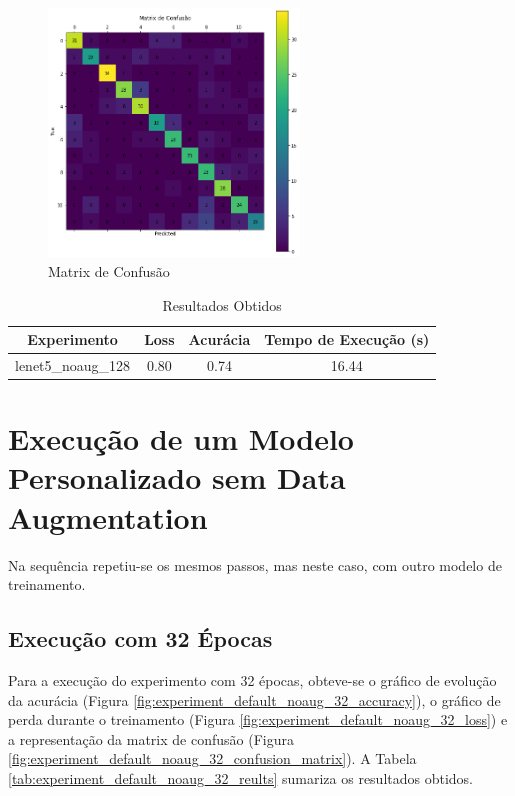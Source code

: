 \documentclass[12pt]{article}
\begin{document}
\begin{figure}[!htb]
  \centering
  \includegraphics[width=18em]{experiments/lenet5_noaug_128/confusion_matrix.png}
  \caption{Matrix de Confusão}
  \label{fig:experiment_lenet5_noaug_128_confusion_matrix}
\end{figure}

\begin{table}[!htb]
  \centering
  \begin{tabular}{|c|c|c|c|}
    \hline
    \textbf{Experimento} & \textbf{Loss} & \textbf{Acurácia} & \textbf{Tempo de Execução (s)} \\ \hline
    lenet5\_noaug\_128   & 0.80          & 0.74              & 16.44                          \\ \hline
  \end{tabular}
  \caption{Resultados Obtidos}
  \label{tab:experiment_lenet5_noaug_128_reults}
\end{table}

\newpage

\section{Execução de um Modelo Personalizado sem Data Augmentation}

Na sequência repetiu-se os mesmos passos, mas neste caso, com outro modelo de treinamento.

\subsection{Execução com 32 Épocas}

Para a execução do experimento com 32 épocas, obteve-se o gráfico de evolução da acurácia (Figura \ref{fig:experiment_default_noaug_32_accuracy}), o gráfico de perda durante o treinamento (Figura \ref{fig:experiment_default_noaug_32_loss}) e a representação da matrix de confusão (Figura \ref{fig:experiment_default_noaug_32_confusion_matrix}). A Tabela \ref{tab:experiment_default_noaug_32_reults} sumariza os resultados obtidos.
\end{document}
